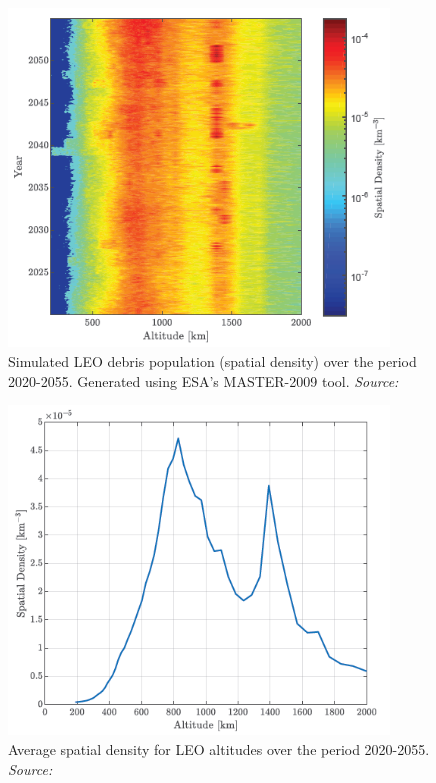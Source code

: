 \begin{figure}
\centering
\includegraphics[width=0.9\textwidth]{Images/crisp1.png}\caption{Simulated LEO debris population (spatial density) over the period 2020-2055. Generated using ESA's MASTER-2009 tool. \textit{Source: \cite{Crisp 2020}}}
\label{crisp1} 
\end{figure}

\begin{figure}
\centering
\includegraphics[width=0.9\textwidth]{Images/crisp2.png}\caption{Average spatial density for LEO altitudes over the period 2020-2055. \textit{Source: \cite{Crisp 2020}}}
\label{crisp2} 
\end{figure}

